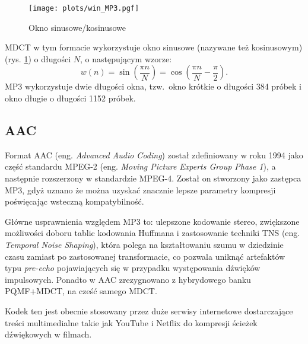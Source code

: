 \documentclass[pl,12pt]{aghdpl}
\let\Oldsubsection\subsection%
\renewcommand{\subsection}{\FloatBarrier\Oldsubsection}
\begin{document}
\begin{figure}[!tbh]
  \centering
  \texttt{[image: plots/win\_MP3.pgf]}
  \caption{Okno sinusowe/kosinusowe}
  \label{fig:win_MP3}
\end{figure}

MDCT w tym formacie wykorzystuje okno sinusowe (nazywane też kosinusowym) (rys.
\ref{fig:win_MP3}) o długości $N$, o następującym wzorze:
\begin{equation}\label{eq:sine_win}
  w(n) = \sin\left(\frac{\pi n}{N}\right) = \cos\left(\frac{\pi n}{N} - \frac{\pi}{2}\right).
\end{equation}
MP3 wykorzystuje dwie długości okna, tzw.\ okno krótkie o długości 384 próbek i okno
długie o długości 1152 próbek.

\subsection{AAC}
Format AAC (eng. \textit{Advanced Audio Coding}) został zdefiniowany w roku 1994
jako część standardu MPEG-2 (eng. \textit{Moving Picture Experts Group Phase
1}), a następnie rozszerzony w standardzie MPEG-4. Został on stworzony jako
zastępca MP3, gdyż uznano że można uzyskać znacznie lepsze parametry kompresji
poświęcając wsteczną kompatybilność.

Główne usprawnienia względem MP3 to: ulepszone kodowanie stereo, zwiększone
możliwości doboru tablic kodowania Huffmana i zastosowanie techniki TNS (eng.
\textit{Temporal Noise Shaping}), która polega na kształtowaniu szumu w
dziedzinie czasu zamiast po zastosowanej transformacie, co pozwala uniknąć
artefaktów typu \textit{pre-echo} pojawiających się w przypadku występowania
dźwięków impulsowych. Ponadto w AAC zrezygnowano z hybrydowego banku PQMF+MDCT,
na cześć samego MDCT.

Kodek ten jest obecnie stosowany przez duże serwisy internetowe dostarczające
treści multimedialne takie jak YouTube i Netflix do kompresji ścieżek
dźwiękowych w filmach.
\end{document}
